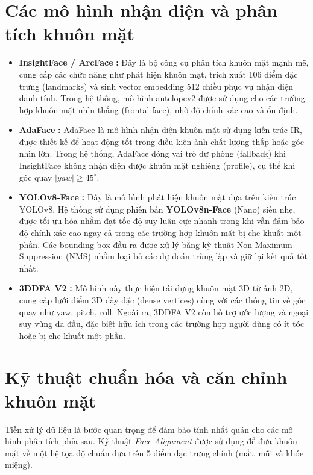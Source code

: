 \documentclass[../main.tex]{subfiles}
\begin{document}
\section{Các mô hình nhận diện và phân tích khuôn mặt}
\begin{itemize}
    \item \textbf{InsightFace / ArcFace} \cite{deng2019arcface}\textbf{:}
    Đây là bộ công cụ phân tích khuôn mặt mạnh mẽ, cung cấp các chức năng như phát hiện khuôn mặt, trích xuất 106 điểm đặc trưng (landmarks) và sinh vector embedding 512 chiều phục vụ nhận diện danh tính. Trong hệ thống, mô hình antelopev2 được sử dụng cho các trường hợp khuôn mặt nhìn thẳng (frontal face), nhờ độ chính xác cao và ổn định.

    \item \textbf{AdaFace} \cite{kim2022adaface}\textbf{:}
    AdaFace là mô hình nhận diện khuôn mặt sử dụng kiến trúc IR, được thiết kế để hoạt động tốt trong điều kiện ảnh chất lượng thấp hoặc góc nhìn lớn. Trong hệ thống, AdaFace đóng vai trò dự phòng (fallback) khi InsightFace không nhận diện được khuôn mặt nghiêng (profile), cụ thể khi góc quay $|yaw| \geq 45^\circ$.

    \item \textbf{YOLOv8-Face} \cite{jocher2023yolov8}\textbf{:}
    Đây là mô hình phát hiện khuôn mặt dựa trên kiến trúc YOLOv8. Hệ thống sử dụng phiên bản \textbf{YOLOv8n-Face} (Nano) siêu nhẹ, được tối ưu hóa nhằm đạt tốc độ suy luận cực nhanh trong khi vẫn đảm bảo độ chính xác cao ngay cả trong các trường hợp khuôn mặt bị che khuất một phần. Các bounding box đầu ra được xử lý bằng kỹ thuật Non-Maximum Suppression (NMS) nhằm loại bỏ các dự đoán trùng lặp và giữ lại kết quả tốt nhất.


    \item \textbf{3DDFA V2} \cite{guo2020towards3ddfa}\textbf{:}
    Mô hình này thực hiện tái dựng khuôn mặt 3D từ ảnh 2D, cung cấp lưới điểm 3D dày đặc (dense vertices) cùng với các thông tin về góc quay như yaw, pitch, roll. Ngoài ra, 3DDFA V2 còn hỗ trợ ước lượng và ngoại suy vùng da đầu, đặc biệt hữu ích trong các trường hợp người dùng có ít tóc hoặc bị che khuất một phần.
\end{itemize}

\section{Kỹ thuật chuẩn hóa và căn chỉnh khuôn mặt}
Tiền xử lý dữ liệu là bước quan trọng để đảm bảo tính nhất quán cho các mô hình phân tích phía sau. Kỹ thuật \textit{Face Alignment} được sử dụng để đưa khuôn mặt về một hệ tọa độ chuẩn dựa trên 5 điểm đặc trưng chính (mắt, mũi và khóe miệng).
\end{document}
